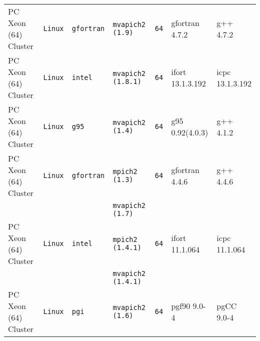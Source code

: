 \begin{longtable}{lllllll}
PC Xeon (64) Cluster  &\tt Linux  &\tt gfortran     &\tt mvapich2 (1.9)   &\tt 64           & gfortran \footnotesize 4.7.2        & g++ \footnotesize 4.7.2         \\ %
PC Xeon (64) Cluster  &\tt Linux  &\tt intel        &\tt mvapich2 (1.8.1) &\tt 64           & ifort \footnotesize 13.1.3.192      & icpc \footnotesize 13.1.3.192   \\ %
PC Xeon (64) Cluster  &\tt Linux  &\tt g95          &\tt mvapich2 (1.4)   &\tt 64           & g95 \footnotesize 0.92(4.0.3)       & g++ \footnotesize 4.1.2         \\ %
PC Xeon (64) Cluster  &\tt Linux  &\tt gfortran     &\tt mpich2 (1.3)     &\tt 64           & gfortran \footnotesize 4.4.6        & g++ \footnotesize 4.4.6         \\ %
                      &           &                 &\tt mvapich2 (1.7)   &                 &                                     &                                 \\
PC Xeon (64) Cluster  &\tt Linux  &\tt intel        &\tt mpich2 (1.4.1)   &\tt 64           & ifort \footnotesize 11.1.064        & icpc \footnotesize 11.1.064     \\ %
                      &           &                 &\tt mvapich2 (1.4.1) &                 &                                     &                                 \\
PC Xeon (64) Cluster  &\tt Linux  &\tt pgi          &\tt mvapich2 (1.6)   &\tt 64           & pgf90 \footnotesize 9.0-4           & pgCC \footnotesize 9.0-4        \\ %

\end{longtable}
